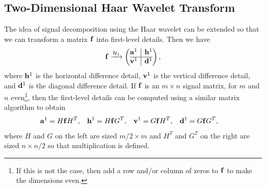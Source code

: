 \documentclass[12pt]{article}
\theoremstyle{definition}
\begin{document}
  \subsection{Two-Dimensional Haar Wavelet Transform}
  The idea of signal decomposition using the Haar wavelet can be extended so that we can transform a matrix \(\vb{f}\) into first-level details. Then we have
  \begin{equation} \label{eqn:2d-wave-dec}
    \vb{f} \xrightarrow{\mathcal{H}_1}
    \left(\begin{array}{@{}c|c@{}}
      \vb{a}^1 & \vb{h}^1\\
      \hline
      \vb{v}^1 & \vb{d}^1
    \end{array}\right),
  \end{equation}
  where \(\vb{h}^1\) is the horizontal difference detail, \(\vb{v}^1\) is the vertical difference detail, and \(\vb{d}^1\) is the diagonal difference detail. If \(\vb{f}\) is an \(m \times n\) signal matrix, for \(m\) and \(n\) even\footnote{If this is not the case, then add a row and/or column of zeros to \(\vb{f}\) to make the dimensions even.}, then the first-level details can be computed using a similar matrix algorithm to obtain
  \begin{align} \label{eqn:matrix-decomp}
      \vb{a}^1 &= H \vb{f} H^T, &
      \vb{h}^1 &= H \vb{f} G^T, &
      \vb{v}^1 &= G \vb{f} H^T, &
      \vb{d}^1 &= G \vb{f} G^T,
  \end{align}
  where \(H\) and \(G\) on the left are sized \(m/2 \times m\) and \(H^T\) and \(G^T\) on the right are sized \(n \times n/2\) so that multiplication is defined.
  
\end{document}

